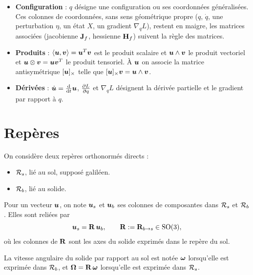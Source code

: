 \documentclass[11pt,a4paper]{report}
\begin{document}
\begin{itemize}
        $\Ker\mat{A}$, $\Ima\mat{A}$ et $\rang\mat{A}$ le noyau, l'image
        et le rang de $\mat{A}$.
    \item \textbf{Configuration} : $q$ désigne une configuration ou ses
        coordonnées généralisées. Ces colonnes de coordonnées, sans
        sens géométrique propre ($q$, $\dot q$, une perturbation
        $\eta$, un état $X$, un gradient $\nabla_q L$), restent en
        maigre, les matrices associées (jacobienne $\mathbf{J}_f$,
        hessienne $\mathbf{H}_f$) suivent la règle des matrices.
    \item \textbf{Produits} : $\langle\bm{u},\bm{v}\rangle =
        \bm{u}^T\bm{v}$ est le produit scalaire et
        $\bm{u}\wedge\bm{v}$ le produit vectoriel et
        $\bm{u}\otimes\bm{v} = \bm{u}\bm{v}^T$ le produit
        tensoriel. À $\bm{u}$ on
        associe la matrice antisymétrique $[\bm{u}]_{\times}$ telle que
        $[\bm{u}]_{\times}\bm{v} = \bm{u}\wedge\bm{v}$.
    \item \textbf{Dérivées} : $\dot{\bm{u}} = \frac{\mathrm{d}}{\mathrm{d} t}\bm{u}$,
        $\frac{\partial L}{\partial q}$ et $\nabla_q L$ désignent la dérivée partielle et le
        gradient par rapport à $q$.
\end{itemize}

\section*{Repères}

On considère deux repères orthonormés directs :
\begin{itemize}
    \item $\mathcal{R}_{s}$, lié au sol, supposé galiléen.
    \item $\mathcal{R}_{b}$, lié au solide.
\end{itemize}

Pour un vecteur $\bm{u}$, on note $\bm{u}_s$ et $\bm{u}_b$ ses
colonnes de composantes dans $\mathcal{R}_{s}$ et $\mathcal{R}_{b}$. Elles sont reliées
par
\[
    \bm{u}_s = \mathbf{R}\,\bm{u}_b,
    \qquad \mathbf{R} := \mathbf{R}_{b\to s}\in\mathrm{SO}(3),
\]
où les colonnes de $\mathbf{R}$ sont les axes du solide exprimés dans le
repère du sol.

La vitesse angulaire du solide par rapport au sol est notée
$\bm{\omega}$ lorsqu'elle est exprimée dans $\mathcal{R}_{b}$, et
$\bm{\Omega} = \mathbf{R}\,\bm{\omega}$ lorsqu'elle est exprimée dans
$\mathcal{R}_{s}$.








\end{document}
